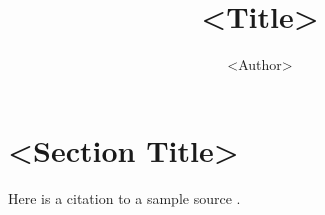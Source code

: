 \documentclass[stu,12pt,floatsintext]{apa7}
\title{<Title>}
\author{<Author>}
\begin{document}
\maketitle
\thispagestyle{plain}
\pagestyle{plain}

\section{<Section Title>}
Here is a citation to a sample source \parencite{sample2024}.

\newpage

\printbibliography
\end{document}
